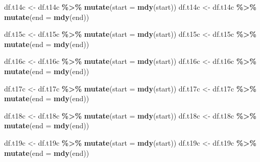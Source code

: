 \documentclass[
  11,
]{book}
\newenvironment{Shaded}{\begin{snugshade}}{\end{snugshade}}
\newcommand{\AttributeTok}[1]{\textcolor[rgb]{0.27,0.27,0.27}{#1}}
\newcommand{\FunctionTok}[1]{\textcolor[rgb]{0.27,0.27,0.27}{\textbf{#1}}}
\newcommand{\NormalTok}[1]{#1}
\newcommand{\OtherTok}[1]{\textcolor[rgb]{0.37,0.37,0.37}{#1}}
\newcommand{\SpecialCharTok}[1]{\textcolor[rgb]{0.43,0.43,0.43}{\textbf{#1}}}
\begin{document}
\begin{Shaded}
\begin{Highlighting}[]
\NormalTok{df.t14c }\OtherTok{\textless{}{-}}\NormalTok{ df.t14c }\SpecialCharTok{\%\textgreater{}\%} \FunctionTok{mutate}\NormalTok{(}\AttributeTok{start =} \FunctionTok{mdy}\NormalTok{(start))}
\NormalTok{df.t14c }\OtherTok{\textless{}{-}}\NormalTok{ df.t14c }\SpecialCharTok{\%\textgreater{}\%} \FunctionTok{mutate}\NormalTok{(}\AttributeTok{end =} \FunctionTok{mdy}\NormalTok{(end))}

\NormalTok{df.t15c }\OtherTok{\textless{}{-}}\NormalTok{ df.t15c }\SpecialCharTok{\%\textgreater{}\%} \FunctionTok{mutate}\NormalTok{(}\AttributeTok{start =} \FunctionTok{mdy}\NormalTok{(start))}
\NormalTok{df.t15c }\OtherTok{\textless{}{-}}\NormalTok{ df.t15c }\SpecialCharTok{\%\textgreater{}\%} \FunctionTok{mutate}\NormalTok{(}\AttributeTok{end =} \FunctionTok{mdy}\NormalTok{(end))}

\NormalTok{df.t16c }\OtherTok{\textless{}{-}}\NormalTok{ df.t16c }\SpecialCharTok{\%\textgreater{}\%} \FunctionTok{mutate}\NormalTok{(}\AttributeTok{start =} \FunctionTok{mdy}\NormalTok{(start))}
\NormalTok{df.t16c }\OtherTok{\textless{}{-}}\NormalTok{ df.t16c }\SpecialCharTok{\%\textgreater{}\%} \FunctionTok{mutate}\NormalTok{(}\AttributeTok{end =} \FunctionTok{mdy}\NormalTok{(end))}

\NormalTok{df.t17c }\OtherTok{\textless{}{-}}\NormalTok{ df.t17c }\SpecialCharTok{\%\textgreater{}\%} \FunctionTok{mutate}\NormalTok{(}\AttributeTok{start =} \FunctionTok{mdy}\NormalTok{(start))}
\NormalTok{df.t17c }\OtherTok{\textless{}{-}}\NormalTok{ df.t17c }\SpecialCharTok{\%\textgreater{}\%} \FunctionTok{mutate}\NormalTok{(}\AttributeTok{end =} \FunctionTok{mdy}\NormalTok{(end))}

\NormalTok{df.t18c }\OtherTok{\textless{}{-}}\NormalTok{ df.t18c }\SpecialCharTok{\%\textgreater{}\%} \FunctionTok{mutate}\NormalTok{(}\AttributeTok{start =} \FunctionTok{mdy}\NormalTok{(start))}
\NormalTok{df.t18c }\OtherTok{\textless{}{-}}\NormalTok{ df.t18c }\SpecialCharTok{\%\textgreater{}\%} \FunctionTok{mutate}\NormalTok{(}\AttributeTok{end =} \FunctionTok{mdy}\NormalTok{(end))}

\NormalTok{df.t19c }\OtherTok{\textless{}{-}}\NormalTok{ df.t19c }\SpecialCharTok{\%\textgreater{}\%} \FunctionTok{mutate}\NormalTok{(}\AttributeTok{start =} \FunctionTok{mdy}\NormalTok{(start))}
\NormalTok{df.t19c }\OtherTok{\textless{}{-}}\NormalTok{ df.t19c }\SpecialCharTok{\%\textgreater{}\%} \FunctionTok{mutate}\NormalTok{(}\AttributeTok{end =} \FunctionTok{mdy}\NormalTok{(end))}
\end{Highlighting}
\end{Shaded}
\end{document}
